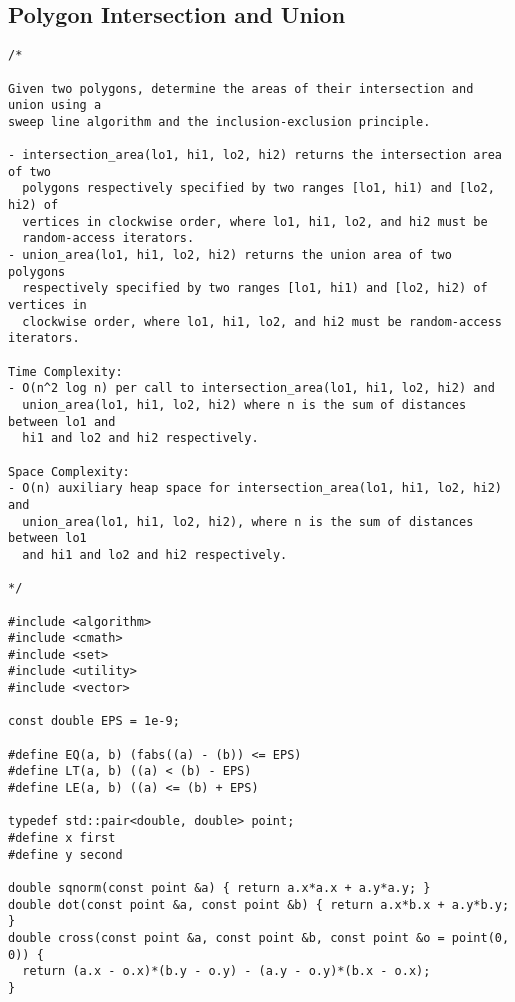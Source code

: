 \subsection{Polygon Intersection and Union}
\begin{lstlisting}
/*

Given two polygons, determine the areas of their intersection and union using a
sweep line algorithm and the inclusion-exclusion principle.

- intersection_area(lo1, hi1, lo2, hi2) returns the intersection area of two
  polygons respectively specified by two ranges [lo1, hi1) and [lo2, hi2) of
  vertices in clockwise order, where lo1, hi1, lo2, and hi2 must be
  random-access iterators.
- union_area(lo1, hi1, lo2, hi2) returns the union area of two polygons
  respectively specified by two ranges [lo1, hi1) and [lo2, hi2) of vertices in
  clockwise order, where lo1, hi1, lo2, and hi2 must be random-access iterators.

Time Complexity:
- O(n^2 log n) per call to intersection_area(lo1, hi1, lo2, hi2) and
  union_area(lo1, hi1, lo2, hi2) where n is the sum of distances between lo1 and
  hi1 and lo2 and hi2 respectively.

Space Complexity:
- O(n) auxiliary heap space for intersection_area(lo1, hi1, lo2, hi2) and
  union_area(lo1, hi1, lo2, hi2), where n is the sum of distances between lo1
  and hi1 and lo2 and hi2 respectively.

*/

#include <algorithm>
#include <cmath>
#include <set>
#include <utility>
#include <vector>

const double EPS = 1e-9;

#define EQ(a, b) (fabs((a) - (b)) <= EPS)
#define LT(a, b) ((a) < (b) - EPS)
#define LE(a, b) ((a) <= (b) + EPS)

typedef std::pair<double, double> point;
#define x first
#define y second

double sqnorm(const point &a) { return a.x*a.x + a.y*a.y; }
double dot(const point &a, const point &b) { return a.x*b.x + a.y*b.y; }
double cross(const point &a, const point &b, const point &o = point(0, 0)) {
  return (a.x - o.x)*(b.y - o.y) - (a.y - o.y)*(b.x - o.x);
}


\end{lstlisting}
